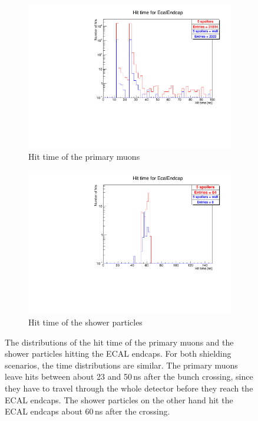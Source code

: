 \begin{figure}
    \centering
    \begin{subfigure}[b]{0.49\textwidth}
    \centering
        \includegraphics[height=0.26\textheight]{figures/muon_hittime_all_layers_EcalEndcap.pdf}
        \caption{Hit time of the primary muons}
	\label{fig:hittime_ECAL}
    \end{subfigure}
    \begin{subfigure}[b]{0.49\textwidth}
    \centering
        \includegraphics[height=0.26\textheight]{figures/muon_hittime_all_layers_shower_EcalEndcap.pdf}
        \caption{Hit time of the shower particles}
        \label{fig:hittime_shower_ECAL}
    \end{subfigure}
    \caption[Hit time distributions in the ECAL endcaps]{
    The distributions of the hit time of the primary muons and the shower particles hitting the ECAL endcaps.
    For both shielding scenarios, the time distributions are similar.
    The primary muons leave hits between about 23 and \unit{50}\,{ns} after the bunch crossing, since they have to travel through the whole detector before they reach the ECAL endcaps.
    The shower particles on the other hand hit the ECAL endcaps about \unit{60}\,{ns} after the crossing.
    }
    \label{fig:Hit_time}
\end{figure}